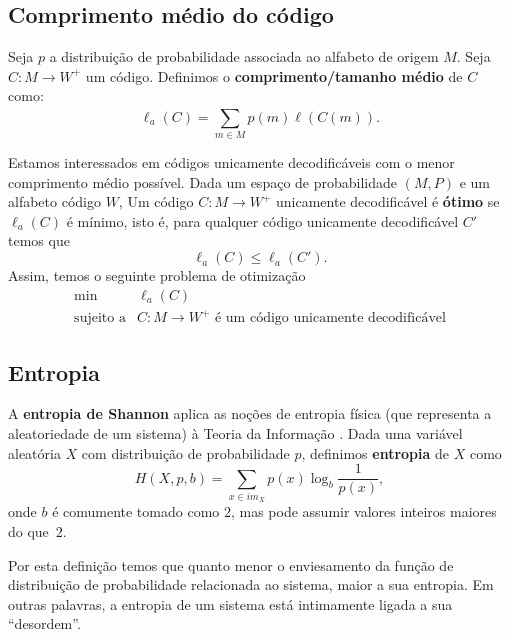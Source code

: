 \subsection{Comprimento médio do código}
Seja $p$ a distribuição de probabilidade associada ao alfabeto de
origem $M$. Seja $C: M \to W^+$ um código. Definimos o
\textbf{comprimento/tamanho médio} de $C$ como:
\begin{equation} \label{eq:code_len}
\ell_a (C) = \sum_{m \in M}^{} p(m) \ell(C(m)).
\end{equation}

Estamos interessados em códigos unicamente decodificáveis com o menor
comprimento médio possível. Dada um espaço de probabilidade $(M, P)$ e
um alfabeto código $W$, Um código $C: M \to W^+$ unicamente
decodificável é \textbf{ótimo} se $\ell_a(C)$ é mínimo, isto é, para
qualquer código unicamente decodificável $C'$ temos que
\begin{equation} \label{eq:code_len_optimal}
\ell_a(C) \leq \ell_a(C').
\end{equation}
Assim, temos o seguinte problema de otimização
\begin{equation} \label{eq:prog_code_len}
  \begin{array}{rl}
    \min & \ell_a(C)\\
    \text{sujeito a} &C: M \to W^+ \text{ é um código unicamente decodificável}
  \end{array}
\end{equation}


\subsection{Entropia}
A \textbf{entropia de Shannon} aplica as noções de entropia física
(que representa a aleatoriedade de um sistema) à Teoria da
Informação \cite{Ble}. Dada uma variável aleatória $X$ com distribuição de
probabilidade $p$, definimos \textbf{entropia} de $X$ como
\begin{equation} \label{eq:entropy}
H(X, p, b) = \sum_{x \in im_X}^{} p(x) \log_b \frac{1}{p(x)},
\end{equation}
onde $b$ é comumente tomado como $2$, mas pode assumir valores inteiros maiores do que~$2$.

Por esta definição temos que quanto menor o enviesamento da função de distribuição de probabilidade relacionada ao sistema, maior a sua entropia. Em outras palavras, a entropia de um sistema está intimamente ligada a sua ``desordem''.

